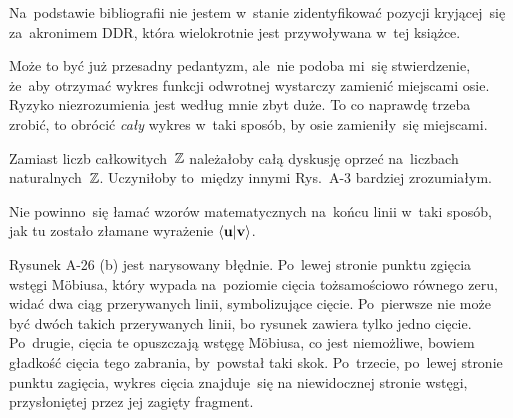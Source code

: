 \documentclass[a4paper,11pt]{article}
\begin{document}
\vspace{\spaceFour}





\start {} Na~podstawie bibliografii nie jestem w~stanie
zidentyfikować pozycji kryjącej~się za~akronimem DDR, która
wielokrotnie jest przywoływana w~tej książce.

\vspace{\spaceFour}





\start {} Może to być już przesadny pedantyzm, ale~nie podoba
mi~się stwierdzenie, że~aby otrzymać wykres funkcji odwrotnej
wystarczy zamienić miejscami osie. Ryzyko niezrozumienia jest według
mnie zbyt duże. To co naprawdę trzeba zrobić, to obrócić \textit{cały}
wykres w~taki sposób, by osie zamieniły~się miejscami.

\vspace{\spaceFour}





\start {} Zamiast liczb całkowitych~$\mathbb{Z}$ należałoby całą
dyskusję oprzeć na~liczbach naturalnych~$\mathbb{Z}$. Uczyniłoby to~między
innymi Rys.~A-3 bardziej zrozumiałym.

\vspace{\spaceFour}





\start {} Nie powinno~się łamać wzorów matematycznych
na~końcu linii w~taki sposób, jak tu zostało złamane wyrażenie
$\langle \mathbf{u} | \mathbf{v} \rangle$.

\vspace{\spaceFour}





\start {} Rysunek A-26 (b) jest narysowany błędnie.
Po~lewej stronie punktu zgięcia wstęgi M\"{o}biusa, który wypada
na~poziomie cięcia tożsamościowo równego zeru, widać dwa ciąg
przerywanych linii, symbolizujące cięcie. Po~pierwsze nie może być
dwóch takich przerywanych linii, bo rysunek zawiera tylko jedno
cięcie. Po~drugie, cięcia te opuszczają wstęgę M\"{o}biusa, co jest
niemożliwe, bowiem gładkość cięcia tego zabrania, by~powstał taki
skok. Po~trzecie, po~lewej stronie punktu zagięcia, wykres cięcia
znajduje~się na niewidocznej stronie wstęgi, przysłoniętej przez jej
zagięty fragment.

\vspace{\spaceFour}
\end{document}

